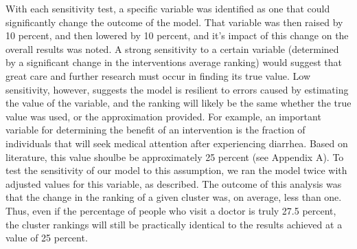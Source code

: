 With each sensitivity test, a specific variable was identified as one that could significantly change the outcome of the model.
That variable was then raised by 10 percent, and then lowered by 10 percent, and it's impact of this change on the overall results was noted.
A strong sensitivity to a certain variable (determined by a significant change in the interventions average ranking) would suggest that great care and further research must occur in finding its true value.
Low sensitivity, however, suggests the model is resilient to errors caused by estimating the value of the variable, and the ranking will likely be the same whether the true value was used, or the approximation provided.
For example, an important variable for determining the benefit of an intervention is the fraction of individuals that will seek medical attention after experiencing diarrhea.
Based on literature, this value shoulbe be approximately 25 percent (see Appendix A).
To test the sensitivity of our model to this assumption, we ran the model twice with adjusted values for this variable, as described.
The outcome of this analysis was that the change in the ranking of a given cluster was, on average, less than one.
Thus, even if the percentage of people who visit a doctor is truly 27.5 percent, the cluster rankings will still be practically identical to the results achieved at a value of 25 percent.
